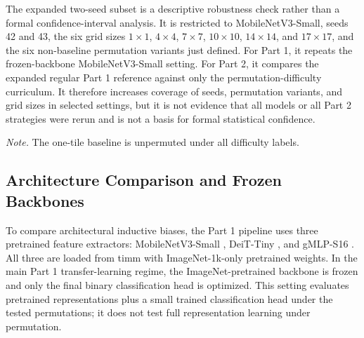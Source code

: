 \documentclass[12pt]{article}
\newcommand{\reporttablesize}{\small}
\newcommand{\reporttablenotesize}{\small}
\begin{document}
The expanded two-seed subset is a descriptive robustness check rather than a formal confidence-interval analysis. It is restricted to MobileNetV3-Small, seeds 42 and 43, the six grid sizes $1 \times 1$, $4 \times 4$, $7 \times 7$, $10 \times 10$, $14 \times 14$, and $17 \times 17$, and the six non-baseline permutation variants just defined. For Part 1, it repeats the frozen-backbone MobileNetV3-Small setting. For Part 2, it compares the expanded regular Part 1 reference against only the permutation-difficulty curriculum. It therefore increases coverage of seeds, permutation variants, and grid sizes in selected settings, but it is not evidence that all models or all Part 2 strategies were rerun and is not a basis for formal statistical confidence.

\begin{table}[t]
  \centering
  \reporttablesize
  \caption{Deterministic tile-permutation preset parameters used for all nontrivial grid sizes.}
  \label{tab:permutation-presets}
  \begin{flushleft}
  \reporttablenotesize\emph{Note.} The one-tile baseline is unpermuted under all difficulty labels.
  \end{flushleft}
\end{table}

\subsection{Architecture Comparison and Frozen Backbones}

To compare architectural inductive biases, the Part 1 pipeline uses three pretrained feature extractors: MobileNetV3-Small \citep{howard2019searching}, DeiT-Tiny \citep{touvron2021deit}, and gMLP-S16 \citep{liu2021pay}. All three are loaded from timm with ImageNet-1k-only pretrained weights. In the main Part 1 transfer-learning regime, the ImageNet-pretrained backbone is frozen and only the final binary classification head is optimized. This setting evaluates pretrained representations plus a small trained classification head under the tested permutations; it does not test full representation learning under permutation.
\end{document}
